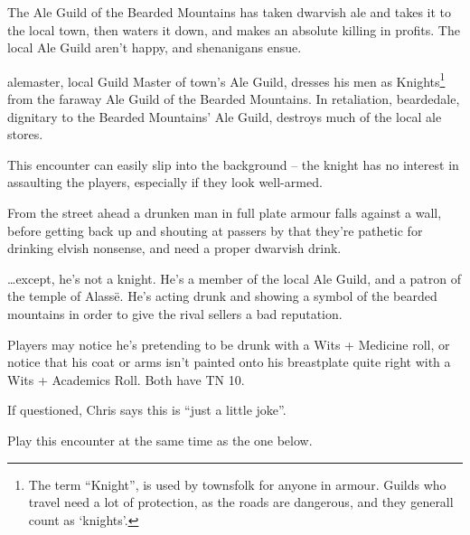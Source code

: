\begin{multicols}{2}

\humansoldier


The Ale Guild of the Bearded Mountains has taken dwarvish ale and takes it to the local town, then waters it down, and makes an absolute killing in profits.
The local Ale Guild aren't happy, and shenanigans ensue.

\Gls{alemaster}, local Guild Master of town's Ale Guild, dresses his men as Knights\footnote{The term ``Knight'', is used by townsfolk for anyone in armour.  Guilds who travel need a lot of protection, as the roads are dangerous, and they generall count as `knights'.} from the faraway Ale Guild of the Bearded Mountains.  In retaliation, \gls{beardedale}, dignitary to the Bearded Mountains' Ale Guild, destroys much of the local ale stores.


This encounter can easily slip into the background -- the knight has no interest in assaulting the players, especially if they look well-armed.

\begin{boxtext}

	From the street ahead a drunken man in full plate armour falls against a wall, before getting back up and shouting at passers by that they're pathetic for drinking elvish nonsense, and need a proper dwarvish drink.

\end{boxtext}

\ldots except, he's not a knight.
He's a member of the local Ale Guild, and a patron of the temple of Alass\"{e}.
He's acting drunk and showing a symbol of the bearded mountains in order to give the rival sellers a bad reputation.

Players may notice he's pretending to be drunk with a Wits + Medicine roll, or notice that his coat or arms isn't painted onto his breastplate quite right with a Wits + Academics Roll.  Both have TN 10.



If questioned, Chris says this is ``just a little joke''.


Play this encounter at the same time as the one below.


\end{multicols}
